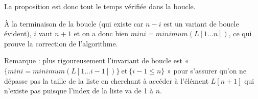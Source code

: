 \begin{enumerate}
La proposition est donc tout le temps vérifiée dans la boucle. 

À la terminaison de la boucle (qui existe car $n-i$ est un variant de boucle évident), $i$ vaut $n+1$ et on a donc bien $mini=minimum(L[1...n])$, ce qui prouve la correction de l'algorithme.

Remarque : plus rigoureusement l'invariant de boucle est « $\{mini = minimum(L[1...i-1])\}\ \text{et}\ \{i-1 \leq n\}$ » pour s'assurer qu'on ne dépasse pas la taille de la liste en cherchant à accéder à l'élément $L[n+1]$ qui n'existe pas puisque l'index de la liste va de 1 à $n$.

\end{enumerate}


